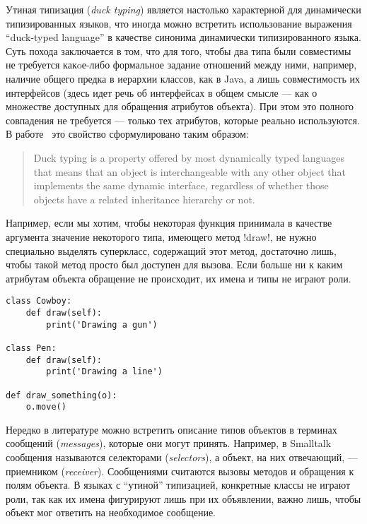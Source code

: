 Утиная типизация (\emph{duck typing}) является настолько характерной для
динамически типизированных языков, что иногда можно встретить использование
выражения ``duck-typed language'' в качестве синонима динамически
типизированного языка. Суть похода заключается в том, что для того, чтобы два
типа были совместимы не требуется какoе-либо формальное задание отношений между
ними, например, наличие общего предка в иерархии классов, как в Java, а лишь
совместимость их интерфейсов (здесь идет речь об интерфейсах в общем смысле ---
как о множестве доступных для обращения атрибутов объекта). При этом это полного
совпадения не требуется --- только тех атрибутов, которые реально используются.
В работе~\cite{Ortin2011:union} это свойство сформулировано таким образом:

\begin{quote}
    Duck typing is a property offered by most dynamically typed
    languages that means that an object is interchangeable with any other
    object that implements the same dynamic interface, regardless of whether
    those objects have a related inheritance hierarchy or not.
\end{quote}

Например, если мы хотим, чтобы некоторая функция принимала в качестве аргумента
значение некоторого типа, имеющего метод !draw!, не нужно специально выделять
суперкласс, содержащий этот метод, достаточно лишь, чтобы такой метод просто был
доступен для вызова. Если больше ни к каким атрибутам объекта обращение не
происходит, их имена и типы не играют роли. 

\begin{lstlisting}
class Cowboy:
    def draw(self):
        print('Drawing a gun')

class Pen:
    def draw(self):
        print('Drawing a line')

def draw_something(o):
    o.move()
\end{lstlisting}

Нередко в литературе можно встретить описание типов объектов в терминах
сообщений (\emph{messages}), которые они могут принять. Например, в Smalltalk
сообщения называются селекторами (\emph{selectors}), а объект, на них отвечающий, ---
приемником (\emph{receiver}). Сообщениями считаются вызовы методов и обращения к полям
объекта. В языках с ``утиной'' типизацией, конкретные классы не играют роли, так
как их имена фигурируют лишь при их объявлении, важно лишь, чтобы объект мог
ответить на необходимое сообщение.  

